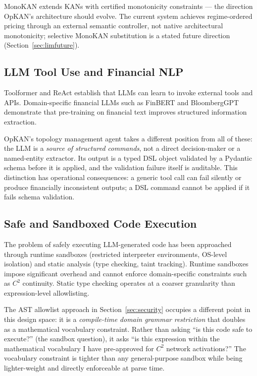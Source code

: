 \documentclass[11pt,a4paper]{article}
\begin{document}
MonoKAN \citep{polo_molina_etal_2024_monokan} extends KANs with certified monotonicity
constraints --- the direction OpKAN's architecture should evolve. The current system
achieves regime-ordered pricing through an external semantic controller, not native
architectural monotonicity; selective MonoKAN substitution is a stated future direction
(Section~\ref{sec:limfuture}).

\subsection{LLM Tool Use and Financial NLP}

Toolformer \citep{schick_etal_2023_toolformer} and ReAct \citep{yao_etal_2023_react}
establish that LLMs can learn to invoke external tools and APIs. Domain-specific
financial LLMs such as FinBERT \citep{huang2023finbert} and BloombergGPT
\citep{wu2023bloomberggpt} demonstrate that pre-training on financial text improves
structured information extraction.

OpKAN's topology management agent takes a different position from all of these: the LLM
is a \emph{source of structured commands}, not a direct decision-maker or a
named-entity extractor. Its output is a typed DSL object validated by a Pydantic schema
before it is applied, and the validation failure itself is auditable. This distinction
has operational consequences: a generic tool call can fail silently or produce
financially inconsistent outputs; a DSL command cannot be applied if it fails schema
validation.

\subsection{Safe and Sandboxed Code Execution}

The problem of safely executing LLM-generated code has been approached through runtime
sandboxes (restricted interpreter environments, OS-level isolation) and static analysis
(type checking, taint tracking). Runtime sandboxes impose significant overhead and
cannot enforce domain-specific constraints such as $C^2$ continuity. Static type
checking operates at a coarser granularity than expression-level allowlisting.

The AST allowlist approach in Section~\ref{sec:security} occupies a different point in
this design space: it is a \emph{compile-time domain grammar restriction} that doubles
as a mathematical vocabulary constraint. Rather than asking ``is this code safe to
execute?'' (the sandbox question), it asks ``is this expression within the mathematical
vocabulary I have pre-approved for $C^2$ network activations?'' The vocabulary
constraint is tighter than any general-purpose sandbox while being lighter-weight and
directly enforceable at parse time.
\end{document}
